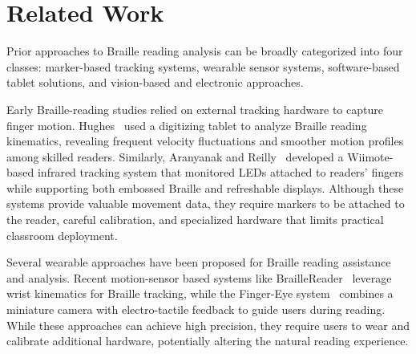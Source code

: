 \documentclass[conference]{IEEEtran}
\begin{document}
    \section{Related Work}
    \label{sec:related}

    Prior approaches to Braille reading analysis can be broadly
    categorized into four classes: marker-based tracking systems,
    wearable sensor systems, software-based tablet solutions, and
    vision-based and electronic approaches. 


    Early Braille-reading studies relied on external tracking hardware to
    capture finger motion. Hughes~\cite{b5} used a digitizing tablet to analyze Braille
    reading kinematics, revealing frequent velocity fluctuations and
    smoother motion profiles among skilled readers. Similarly, Aranyanak and
    Reilly~\cite{b6} developed a Wiimote-based infrared tracking system
    that monitored LEDs attached to readers' fingers while supporting both
    embossed Braille and refreshable displays. Although these systems
    provide valuable movement data, they require markers to be attached to
    the reader, careful calibration, and specialized hardware that limits
    practical classroom deployment.


    Several wearable approaches have been proposed for Braille reading
    assistance and analysis. Recent motion-sensor based systems like
    BrailleReader~\cite{liu2024braillereader} leverage wrist kinematics
    for Braille tracking, while the Finger-Eye system~\cite{b2} combines
    a miniature camera with electro-tactile feedback to guide users during
    reading. While these approaches can achieve high precision, they
    require users to wear and calibrate additional hardware, potentially
    altering the natural reading experience.

\end{document}
